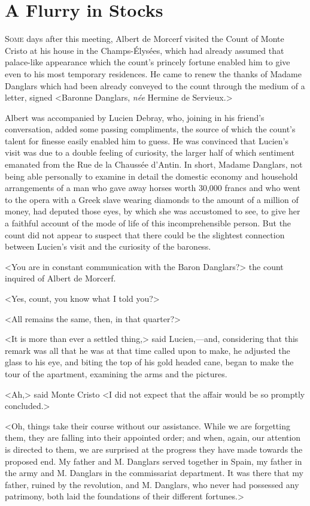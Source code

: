 \chapter{A Flurry in Stocks} 

 \lettrine{S}{ome} days after this meeting, Albert de Morcerf visited the Count of Monte Cristo at his house in the Champs-Élysées, which had already assumed that palace-like appearance which the count's princely fortune enabled him to give even to his most temporary residences. He came to renew the thanks of Madame Danglars which had been already conveyed to the count through the medium of a letter, signed <Baronne Danglars, \textit{née} Hermine de Servieux.> 

 Albert was accompanied by Lucien Debray, who, joining in his friend's conversation, added some passing compliments, the source of which the count's talent for finesse easily enabled him to guess. He was convinced that Lucien's visit was due to a double feeling of curiosity, the larger half of which sentiment emanated from the Rue de la Chaussée d'Antin. In short, Madame Danglars, not being able personally to examine in detail the domestic economy and household arrangements of a man who gave away horses worth 30,000 francs and who went to the opera with a Greek slave wearing diamonds to the amount of a million of money, had deputed those eyes, by which she was accustomed to see, to give her a faithful account of the mode of life of this incomprehensible person. But the count did not appear to suspect that there could be the slightest connection between Lucien's visit and the curiosity of the baroness. 

 <You are in constant communication with the Baron Danglars?> the count inquired of Albert de Morcerf. 

 <Yes, count, you know what I told you?> 

 <All remains the same, then, in that quarter?> 

 <It is more than ever a settled thing,> said Lucien,—and, considering that this remark was all that he was at that time called upon to make, he adjusted the glass to his eye, and biting the top of his gold headed cane, began to make the tour of the apartment, examining the arms and the pictures. 

 <Ah,> said Monte Cristo <I did not expect that the affair would be so promptly concluded.> 

 <Oh, things take their course without our assistance. While we are forgetting them, they are falling into their appointed order; and when, again, our attention is directed to them, we are surprised at the progress they have made towards the proposed end. My father and M. Danglars served together in Spain, my father in the army and M. Danglars in the commissariat department. It was there that my father, ruined by the revolution, and M. Danglars, who never had possessed any patrimony, both laid the foundations of their different fortunes.> 

